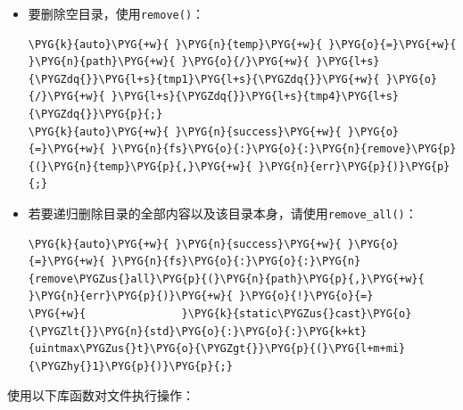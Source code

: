 \begin{itemize}

\item 要删除空目录，使用\texttt{remove()}：


\begin{codeblockbg}
\begin{Verbatim}[commandchars=\\\{\},breaklines=true,breakanywhere=true,fontsize=\codefont,xleftmargin=17bp]
\PYG{k}{auto}\PYG{+w}{ }\PYG{n}{temp}\PYG{+w}{ }\PYG{o}{=}\PYG{+w}{ }\PYG{n}{path}\PYG{+w}{ }\PYG{o}{/}\PYG{+w}{ }\PYG{l+s}{\PYGZdq{}}\PYG{l+s}{tmp1}\PYG{l+s}{\PYGZdq{}}\PYG{+w}{ }\PYG{o}{/}\PYG{+w}{ }\PYG{l+s}{\PYGZdq{}}\PYG{l+s}{tmp4}\PYG{l+s}{\PYGZdq{}}\PYG{p}{;}
\PYG{k}{auto}\PYG{+w}{ }\PYG{n}{success}\PYG{+w}{ }\PYG{o}{=}\PYG{+w}{ }\PYG{n}{fs}\PYG{o}{:}\PYG{o}{:}\PYG{n}{remove}\PYG{p}{(}\PYG{n}{temp}\PYG{p}{,}\PYG{+w}{ }\PYG{n}{err}\PYG{p}{)}\PYG{p}{;}
\end{Verbatim}
\end{codeblockbg}



\item 若要递归删除目录的全部内容以及该目录本身，请使用\texttt{remove\_\allowbreak{}all()}：



\begin{codeblockbg}
\begin{Verbatim}[commandchars=\\\{\},breaklines=true,breakanywhere=true,fontsize=\codefont,xleftmargin=17bp]
\PYG{k}{auto}\PYG{+w}{ }\PYG{n}{success}\PYG{+w}{ }\PYG{o}{=}\PYG{+w}{ }\PYG{n}{fs}\PYG{o}{:}\PYG{o}{:}\PYG{n}{remove\PYGZus{}all}\PYG{p}{(}\PYG{n}{path}\PYG{p}{,}\PYG{+w}{ }\PYG{n}{err}\PYG{p}{)}\PYG{+w}{ }\PYG{o}{!}\PYG{o}{=}
\PYG{+w}{               }\PYG{k}{static\PYGZus{}cast}\PYG{o}{\PYGZlt{}}\PYG{n}{std}\PYG{o}{:}\PYG{o}{:}\PYG{k+kt}{uintmax\PYGZus{}t}\PYG{o}{\PYGZgt{}}\PYG{p}{(}\PYG{l+m+mi}{\PYGZhy{}1}\PYG{p}{)}\PYG{p}{;}
\end{Verbatim}
\end{codeblockbg}

\end{itemize}



使用以下库函数对文件执行操作：



